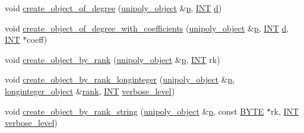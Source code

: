 \begin{DoxyCompactItemize}
\item 
void \mbox{\hyperlink{classunipoly__domain_a129f1730bd8a7268028d6a16fb15c5dc}{create\+\_\+object\+\_\+of\+\_\+degree}} (\mbox{\hyperlink{galois_8h_a77ca58de3d2da6172242493dd9c8aaa8}{unipoly\+\_\+object}} \&\mbox{\hyperlink{alphabet2_8_c_a533391314665d6bf1b5575e9a9cd8552}{p}}, \mbox{\hyperlink{galois_8h_a09fddde158a3a20bd2dcadb609de11dc}{I\+NT}} \mbox{\hyperlink{simeon_8_c_a4339ca06fa882e69473d37bd6d7917d1}{d}})
\item 
void \mbox{\hyperlink{classunipoly__domain_a2c34dcf3f9dfd35e6215cde990ae9313}{create\+\_\+object\+\_\+of\+\_\+degree\+\_\+with\+\_\+coefficients}} (\mbox{\hyperlink{galois_8h_a77ca58de3d2da6172242493dd9c8aaa8}{unipoly\+\_\+object}} \&\mbox{\hyperlink{alphabet2_8_c_a533391314665d6bf1b5575e9a9cd8552}{p}}, \mbox{\hyperlink{galois_8h_a09fddde158a3a20bd2dcadb609de11dc}{I\+NT}} \mbox{\hyperlink{simeon_8_c_a4339ca06fa882e69473d37bd6d7917d1}{d}}, \mbox{\hyperlink{galois_8h_a09fddde158a3a20bd2dcadb609de11dc}{I\+NT}} $\ast$coeff)
\item 
void \mbox{\hyperlink{classunipoly__domain_a3311706a93102009d6d22c69f2f3902f}{create\+\_\+object\+\_\+by\+\_\+rank}} (\mbox{\hyperlink{galois_8h_a77ca58de3d2da6172242493dd9c8aaa8}{unipoly\+\_\+object}} \&\mbox{\hyperlink{alphabet2_8_c_a533391314665d6bf1b5575e9a9cd8552}{p}}, \mbox{\hyperlink{galois_8h_a09fddde158a3a20bd2dcadb609de11dc}{I\+NT}} rk)
\item 
void \mbox{\hyperlink{classunipoly__domain_ae0253c2cb878d008f01b59ec4a61a1a7}{create\+\_\+object\+\_\+by\+\_\+rank\+\_\+longinteger}} (\mbox{\hyperlink{galois_8h_a77ca58de3d2da6172242493dd9c8aaa8}{unipoly\+\_\+object}} \&\mbox{\hyperlink{alphabet2_8_c_a533391314665d6bf1b5575e9a9cd8552}{p}}, \mbox{\hyperlink{classlonginteger__object}{longinteger\+\_\+object}} \&\mbox{\hyperlink{classunipoly__domain_abbb4c71146629a9f1c08f764522f54ca}{rank}}, \mbox{\hyperlink{galois_8h_a09fddde158a3a20bd2dcadb609de11dc}{I\+NT}} \mbox{\hyperlink{simeon_8_c_a818073fbcc2f439e7c56952f67386122}{verbose\+\_\+level}})
\item 
void \mbox{\hyperlink{classunipoly__domain_ae3243756144f89d8a0fbd48f9e1d7840}{create\+\_\+object\+\_\+by\+\_\+rank\+\_\+string}} (\mbox{\hyperlink{galois_8h_a77ca58de3d2da6172242493dd9c8aaa8}{unipoly\+\_\+object}} \&\mbox{\hyperlink{alphabet2_8_c_a533391314665d6bf1b5575e9a9cd8552}{p}}, const \mbox{\hyperlink{galois_8h_ab6cc7b4aeb6ea31aba2b3fbfc83ff5e6}{B\+Y\+TE}} $\ast$rk, \mbox{\hyperlink{galois_8h_a09fddde158a3a20bd2dcadb609de11dc}{I\+NT}} \mbox{\hyperlink{simeon_8_c_a818073fbcc2f439e7c56952f67386122}{verbose\+\_\+level}})

\end{DoxyCompactItemize}
